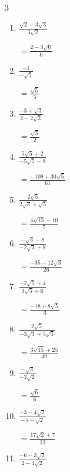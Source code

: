 \begin{multicols}{3}
\begin{enumerate}
        $\displaystyle =\frac{155-35\sqrt{15}}{113}$

  \item $\displaystyle \frac{\sqrt{2}-3\sqrt{3}}{3\sqrt{2}}$

        $\displaystyle =\frac{2-3\sqrt{6}}{6}$

  \item $\displaystyle \frac{-1}{-\sqrt{5}}$

        $\displaystyle =\frac{\sqrt{5}}{5}$

  \item $\displaystyle \frac{-3+\sqrt{3}}{2-2\sqrt{3}}$

        $\displaystyle =\frac{\sqrt{3}}{2}$

\columnbreak %

  \item $\displaystyle \frac{5\sqrt{5}+2}{-5\sqrt{5}-8}$

        $\displaystyle =\frac{-109+30\sqrt{5}}{61}$

  \item $\displaystyle \frac{2\sqrt{5}}{2\sqrt{3}+\sqrt{5}}$

        $\displaystyle =\frac{4\sqrt{15}-10}{7}$

  \item $\displaystyle \frac{-\sqrt{3}-8}{-2\sqrt{3}+8}$

        $\displaystyle =\frac{-35-12\sqrt{3}}{26}$

  \item $\displaystyle \frac{-2\sqrt{5}+4}{3\sqrt{5}+6}$

        $\displaystyle =\frac{-18+8\sqrt{5}}{3}$

  \item $\displaystyle \frac{2\sqrt{5}}{-3\sqrt{3}+5\sqrt{5}}$

        $\displaystyle =\frac{3\sqrt{15}+25}{49}$

\columnbreak %

\resetques

  \item $\displaystyle \frac{-\sqrt{3}}{-3\sqrt{2}}$

        $\displaystyle =\frac{\sqrt{6}}{6}$

  \item $\displaystyle \frac{-3-4\sqrt{2}}{-5-\sqrt{2}}$

        $\displaystyle =\frac{17\sqrt{2}+7}{23}$

  \item $\displaystyle \frac{-6-3\sqrt{2}}{2-4\sqrt{2}}$


\end{enumerate}
\end{multicols}

